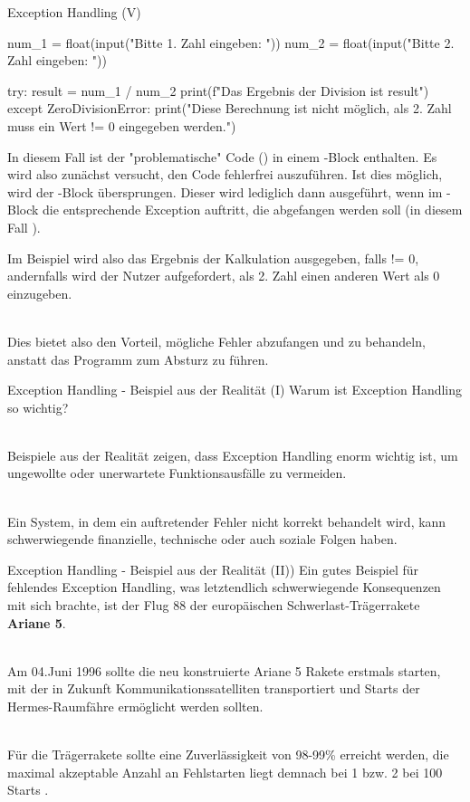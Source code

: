     \begin{frame}{Exception Handling (V)}
\begin{pythoncode}
num_1 = float(input("Bitte 1. Zahl eingeben: "))
num_2 = float(input("Bitte 2. Zahl eingeben: "))

try:
    result = num_1 / num_2
    print(f"Das Ergebnis der Division ist {result}")
except ZeroDivisionError:
    print("Diese Berechnung ist nicht möglich, als 2. Zahl muss ein Wert != 0 eingegeben werden.")
\end{pythoncode}

In diesem Fall ist der "problematische" Code () in einem -Block enthalten. Es wird also zunächst versucht, den Code fehlerfrei auszuführen. Ist dies möglich, wird der -Block übersprungen. Dieser wird lediglich dann ausgeführt, wenn im -Block die entsprechende Exception auftritt, die abgefangen werden soll (in diesem Fall ).\\  \framebreak

Im Beispiel wird also das Ergebnis der Kalkulation ausgegeben, falls  != 0, andernfalls wird der Nutzer aufgefordert, als 2. Zahl einen anderen Wert als 0 einzugeben.\\~\

Dies bietet also den Vorteil, mögliche Fehler abzufangen und zu behandeln, anstatt das Programm zum Absturz zu führen.

    \end{frame}
    
    \begin{frame}[fragile]{Exception Handling - Beispiel aus der Realität (I)}
Warum ist Exception Handling so wichtig?\\~\

Beispiele aus der Realität zeigen, dass Exception Handling enorm wichtig ist, um ungewollte oder unerwartete Funktionsausfälle zu vermeiden. \\~\

Ein System, in dem ein auftretender Fehler nicht korrekt behandelt wird, kann schwerwiegende finanzielle, technische oder auch soziale Folgen haben.
    \end{frame}
    
    \begin{frame}[fragile]{Exception Handling - Beispiel aus der Realität (II))}
Ein gutes Beispiel für fehlendes Exception Handling, was letztendlich schwerwiegende Konsequenzen mit sich brachte, ist der Flug 88 der europäischen Schwerlast-Trägerrakete \textbf{Ariane 5}.\\~\

Am 04.Juni 1996 sollte die neu konstruierte Ariane 5 Rakete erstmals starten, mit der in Zukunft Kommunikationssatelliten transportiert und Starts der Hermes-Raumfähre ermöglicht werden sollten.\\~\

Für die Trägerrakete sollte eine Zuverlässigkeit von 98-99\% erreicht werden, die maximal akzeptable Anzahl an Fehlstarten liegt demnach bei 1 bzw. 2 bei 100 Starts \cite{AAIA}.
    \end{frame}
    
